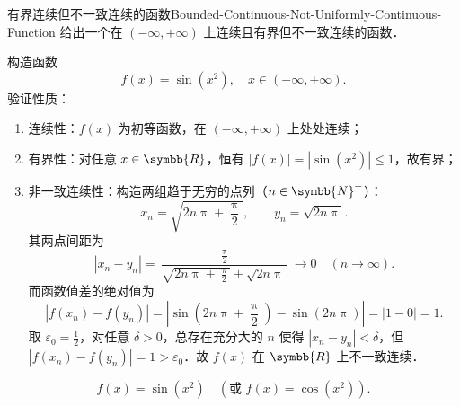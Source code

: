 \begin{problem}{有界连续但不一致连续的函数}{Bounded-Continuous-Not-Uniformly-Continuous-Function}
    给出一个在 $(-\infty, +\infty)$ 上连续且有界但不一致连续的函数．
\end{problem}

\begin{solution}
    构造函数
    \begin{equation}
        f(x) = \sin(x^2), \quad x \in (-\infty, +\infty).
    \end{equation}
    验证性质：
    \begin{enumerate}
        \item 连续性：$f(x)$ 为初等函数，在 $(-\infty, +\infty)$ 上处处连续；
        \item 有界性：对任意 $x \in \symbb{R}$，恒有 $|f(x)| = |\sin(x^2)| \leqslant 1$，故有界；
        \item 非一致连续性：构造两组趋于无穷的点列（$n \in \symbb{N}^+$）：
              \begin{equation}
                  x_n = \sqrt{2n\uppi + \frac{\uppi}{2}}, \qquad y_n = \sqrt{2n\uppi}.
              \end{equation}
              其两点间距为
              \begin{equation}
                  |x_n - y_n| = \frac{\frac{\uppi}{2}}{\sqrt{2n\uppi + \frac{\uppi}{2}} + \sqrt{2n\uppi}} \to 0 \quad (n \to \infty).
              \end{equation}
              而函数值差的绝对值为
              \begin{equation}
                  |f(x_n) - f(y_n)| = \left| \sin\left( 2n\uppi + \frac{\uppi}{2} \right) - \sin(2n\uppi) \right| = |1 - 0| = 1.
              \end{equation}
              取 $\varepsilon_0 = \frac{1}{2}$，对任意 $\delta > 0$，总存在充分大的 $n$ 使得 $|x_n - y_n| < \delta$，但 $|f(x_n) - f(y_n)| = 1 > \varepsilon_0$．故 $f(x)$ 在 $\symbb{R}$ 上不一致连续．
    \end{enumerate}
    \begin{equation}
        \boxed{f(x) = \sin(x^2) \quad \left(\text{或 } f(x) = \cos(x^2)\right).}
    \end{equation}
\end{solution}

\endinput
